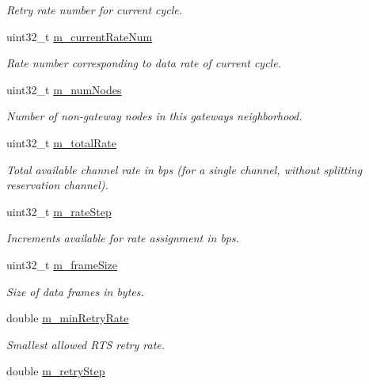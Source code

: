 \begin{DoxyCompactItemize}
\begin{DoxyCompactList}\small\item\em Retry rate number for current cycle. \end{DoxyCompactList}\item 
uint32\+\_\+t \hyperlink{classns3_1_1UanMacRcGw_ab0db1dee5adabd42e325e8c02937e3f7}{m\+\_\+current\+Rate\+Num}
\begin{DoxyCompactList}\small\item\em Rate number corresponding to data rate of current cycle. \end{DoxyCompactList}\item 
uint32\+\_\+t \hyperlink{classns3_1_1UanMacRcGw_a00185ef8e5203de223265077a3ad2cf4}{m\+\_\+num\+Nodes}
\begin{DoxyCompactList}\small\item\em Number of non-\/gateway nodes in this gateway\textquotesingle{}s neighborhood. \end{DoxyCompactList}\item 
uint32\+\_\+t \hyperlink{classns3_1_1UanMacRcGw_aba72112136797b9263624046a7f96b4b}{m\+\_\+total\+Rate}
\begin{DoxyCompactList}\small\item\em Total available channel rate in bps (for a single channel, without splitting reservation channel). \end{DoxyCompactList}\item 
uint32\+\_\+t \hyperlink{classns3_1_1UanMacRcGw_a358dc1512c2e94359c1892eae090f7e1}{m\+\_\+rate\+Step}
\begin{DoxyCompactList}\small\item\em Increments available for rate assignment in bps. \end{DoxyCompactList}\item 
uint32\+\_\+t \hyperlink{classns3_1_1UanMacRcGw_a7cb11b74720c0aa781dea646ac940ac4}{m\+\_\+frame\+Size}
\begin{DoxyCompactList}\small\item\em Size of data frames in bytes. \end{DoxyCompactList}\item 
double \hyperlink{classns3_1_1UanMacRcGw_a1b80a997bc4b47fad40ee75304605786}{m\+\_\+min\+Retry\+Rate}
\begin{DoxyCompactList}\small\item\em Smallest allowed R\+TS retry rate. \end{DoxyCompactList}\item 
double \hyperlink{classns3_1_1UanMacRcGw_add3041a7bf45e5d81fff4600ba20caf6}{m\+\_\+retry\+Step}

\end{DoxyCompactItemize}
